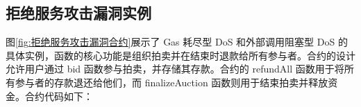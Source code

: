 \documentclass[print, master, vlined, timesmath]{DissertUESTC}
\begin{document}






\subsection{拒绝服务攻击漏洞实例}
图\ref{fig:拒绝服务攻击漏洞合约}展示了 Gas 耗尽型 DoS 和外部调用阻塞型 DoS 的具体实例，函数的核心功能是组织拍卖并在结束时退款给所有参与者。合约的设计允许用户通过 bid 函数参与拍卖，并存储其存款。合约的 refundAll 函数用于将所有参与者的存款退还给他们，而 finalizeAuction 函数则用于结束拍卖并释放资金。合约代码如下：
\end{document}

